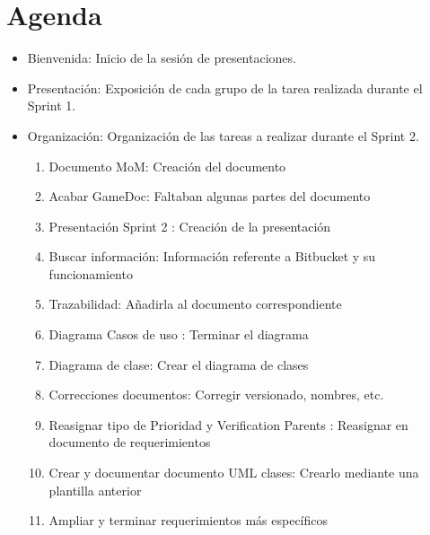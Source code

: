 \section{Agenda}

\begin{itemize}
\subsection{Sprint 1}
\item Bienvenida: Inicio de la sesión de presentaciones.
\item Presentación: Exposición de cada grupo de la tarea realizada durante el Sprint 1.
\item Organización: Organización de las tareas a realizar durante el Sprint 2.
\begin{enumerate}
\item Documento MoM: Creación del documento
\item Acabar GameDoc: Faltaban algunas partes del documento
\item Presentación Sprint 2 : Creación de la presentación
\item Buscar información: Información referente a Bitbucket y su funcionamiento
\item Trazabilidad: Añadirla al documento correspondiente
\item Diagrama Casos de uso : Terminar el diagrama
\item Diagrama de clase: Crear el diagrama de clases
\item Correcciones documentos: Corregir versionado, nombres, etc.
\item Reasignar tipo de Prioridad y Verification Parents : Reasignar en documento de requerimientos
\item Crear y documentar documento UML clases: Crearlo mediante una plantilla anterior
\item Ampliar y terminar requerimientos más específicos
\end{enumerate}




\end{itemize}
